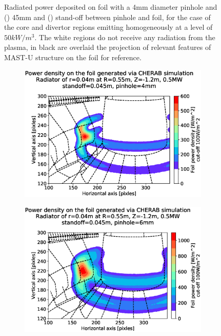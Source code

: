 \begin{figure}
     \caption{Radiated power deposited on foil with a 4mm diameter pinhole and () 45mm and () stand-off between pinhole and foil, for the case of the core and divertor regions emitting homogeneously at a level of $50kW/m^3$. The white regions do not receive any radiation from the plasma, in black are overlaid the projection of relevant features of MAST-U structure on the foil for reference.}
    \label{fig:cherab2}
\end{figure}

\begin{figure}
     \centering
     \begin{subfigure}{0.7\linewidth}
         \centering
         \includegraphics[trim={45 22 0 80},clip,width=\textwidth]{Chapters/chapter2/figs/measured_power_4_452x_radiator_R0.55_Z-1.2-1.3_r0.04.stl.eps}
         \caption{}
         \label{fig:pinhole_resolution4}
     \end{subfigure}
     \begin{subfigure}{0.7\linewidth}
         \centering
         \includegraphics[trim={45 22 0 80},clip,width=\textwidth]{Chapters/chapter2/figs/measured_power_6_452x_radiator_R0.55_Z-1.2-1.3_r0.04.stl.eps}

\end{subfigure}
\end{figure}
